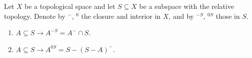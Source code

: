 Let $X$ be a topological space and let $S \subseteq X$ be a subspace with the relative topology. Denote by $^{-}$, $^{0}$ the closure and interior in $X$, and by $^{-S}$, $^{0S}$ those in $S$.

\begin{enumerate}
\item $A \subseteq S \rightarrow A^{-S} = A^{-} \cap S$.
\item $A \subseteq S \rightarrow A^{0S} = S - (S - A)^{-}$.
\end{enumerate}
